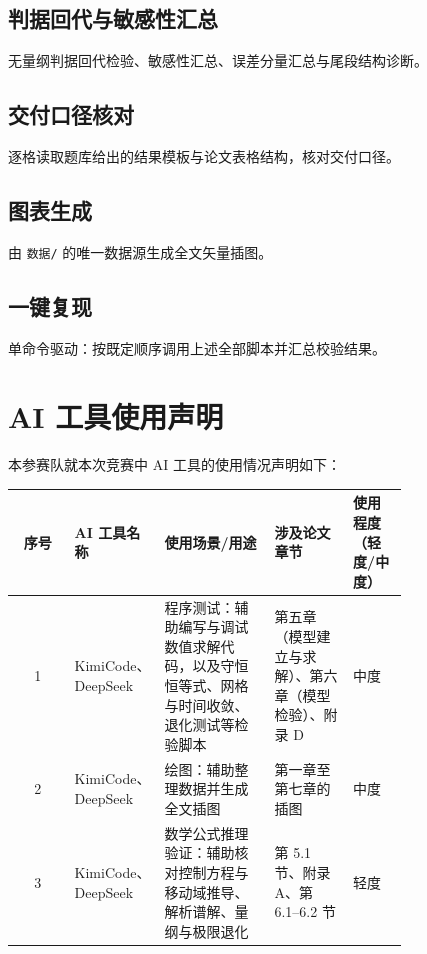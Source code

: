 \documentclass[12pt,a4paper]{ctexart}
\numberwithin{equation}{section}
\begin{document}
\subsection{判据回代与敏感性汇总}
无量纲判据回代检验、敏感性汇总、误差分量汇总与尾段结构诊断。


\subsection{交付口径核对}
逐格读取题库给出的结果模板与论文表格结构，核对交付口径。


\subsection{图表生成}
由 \texttt{数据/} 的唯一数据源生成全文矢量插图。


\subsection{一键复现}
单命令驱动：按既定顺序调用上述全部脚本并汇总校验结果。


\clearpage
\section*{AI 工具使用声明}

本参赛队就本次竞赛中 AI 工具的使用情况声明如下：

\begin{table}[H]
\centering
\small
\begin{tabular}{@{}cp{0.15\linewidth}p{0.29\linewidth}p{0.20\linewidth}p{0.14\linewidth}@{}}
\toprule
序号 & AI 工具名称 & 使用场景/用途 & 涉及论文章节 & 使用程度（轻度/中度） \\
\midrule
1 & KimiCode、DeepSeek & 程序测试：辅助编写与调试数值求解代码，以及守恒恒等式、网格与时间收敛、退化测试等检验脚本 & 第五章（模型建立与求解）、第六章（模型检验）、附录 D & 中度 \\
2 & KimiCode、DeepSeek & 绘图：辅助整理数据并生成全文插图 & 第一章至第七章的插图 & 中度 \\
3 & KimiCode、DeepSeek & 数学公式推理验证：辅助核对控制方程与移动域推导、解析谱解、量纲与极限退化 & 第 5.1 节、附录 A、第 6.1--6.2 节 & 轻度 \\
\bottomrule
\end{tabular}
\end{table}
\end{document}
